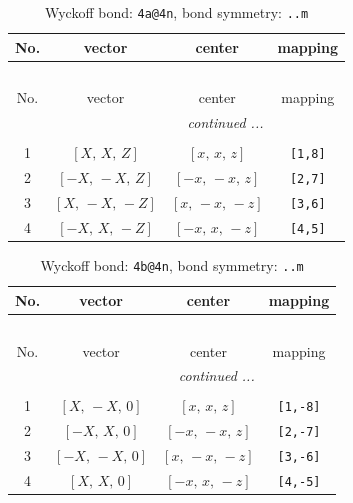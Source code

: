 \documentclass[fleqn,8pt]{jsarticle}
\begin{document}
\begin{longtable}{cccc}
\caption{Wyckoff bond: {\tt 4a@4n}, bond symmetry: {\tt ..m}}
 \\
 \hline \hline
No. & vector & center & mapping \\ \hline \endfirsthead

\multicolumn{3}{l}{\tablename\ \thetable{}} \\
 \hline \hline
No. & vector & center & mapping \\ \hline \endhead

 \hline \hline
\multicolumn{3}{r}{\footnotesize\it continued ...} \\ \endfoot

 \hline \hline
\multicolumn{3}{r}{} \\ \endlastfoot

1 & $\left[ X,\, X,\, Z \right]$ & $\left[ x,\, x,\, z \right]$ & {\tt [1,8]} \\ \hline
2 & $\left[ - X,\, - X,\, Z \right]$ & $\left[ - x,\, - x,\, z \right]$ & {\tt [2,7]} \\ \hline
3 & $\left[ X,\, - X,\, - Z \right]$ & $\left[ x,\, - x,\, - z \right]$ & {\tt [3,6]} \\ \hline
4 & $\left[ - X,\, X,\, - Z \right]$ & $\left[ - x,\, x,\, - z \right]$ & {\tt [4,5]} \\
\end{longtable}
\renewcommand{\arraystretch}{1.2}
\begin{longtable}{cccc}
\caption{Wyckoff bond: {\tt 4b@4n}, bond symmetry: {\tt ..m}}
 \\
 \hline \hline
No. & vector & center & mapping \\ \hline \endfirsthead

\multicolumn{3}{l}{\tablename\ \thetable{}} \\
 \hline \hline
No. & vector & center & mapping \\ \hline \endhead

 \hline \hline
\multicolumn{3}{r}{\footnotesize\it continued ...} \\ \endfoot

 \hline \hline
\multicolumn{3}{r}{} \\ \endlastfoot

1 & $\left[ X,\, - X,\, 0 \right]$ & $\left[ x,\, x,\, z \right]$ & {\tt [1,-8]} \\ \hline
2 & $\left[ - X,\, X,\, 0 \right]$ & $\left[ - x,\, - x,\, z \right]$ & {\tt [2,-7]} \\ \hline
3 & $\left[ - X,\, - X,\, 0 \right]$ & $\left[ x,\, - x,\, - z \right]$ & {\tt [3,-6]} \\ \hline
4 & $\left[ X,\, X,\, 0 \right]$ & $\left[ - x,\, x,\, - z \right]$ & {\tt [4,-5]} \\
\end{longtable}
\end{document}
